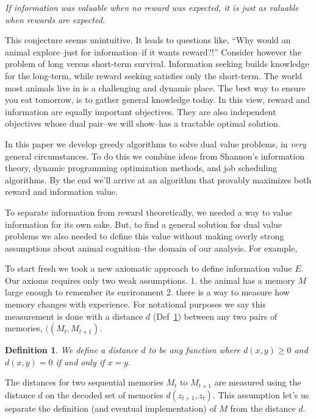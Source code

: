 \documentclass[9pt,twocolumn,twoside]{pnas-new}
\newtheorem{definition}{Definition}
\begin{document}
\textit{If information was valuable when no reward was expected, it is just as valuable when rewards are expected.}

This conjecture seems unintuitive. It leads to questions like, ``Why would an animal explore--just for information--if it wants reward?!'' Consider however the problem of long versus short-term survival. Information seeking builds knowledge for the long-term, while reward seeking satisfies only the short-term. The world most animals live in is a challenging and dynamic place. The best way to ensure you eat tomorrow, is to gather general knowledge today. In this view, reward and information are equally important objectives. They are also independent objectives whose dual pair--we will show--has a tractable optimal solution.

In this paper we develop greedy algorithms to solve dual value problems, in \textit{very} general circumstances. To do this we combine ideas from Shannon's information theory, dynamic programming optimization methods, and job scheduling algorithms. By the end we'll arrive at an algorithm that provably maximizes both reward and information value. 

To separate information from reward theoretically, we needed a way to value information for its own sake. But, to find a general solution for dual value problems we also needed to define this value without making overly strong assumptions about animal cognition--the domain of our analysis. For example, %

To start fresh we took a new axiomatic approach to define information value $E$. Our axioms requires only two weak assumptions. 1. the animal has a memory $M$ large enough to remember its environment 2. there is a way to measure how memory changes with experience. For notational purposes we say this measurement is done with a distance $d$ (Def~\ref{def:distance}) between any two pairs of memories, $((M_{t}, M_{t+1})$.

\begin{definition}
    \label{def:distance}
    We define a distance $d$ to be any function where $d(x,y) \geq 0$ and $d(x,y) = 0$ if and only if $x = y$.
\end{definition}

The distances for two sequential memories $M_{t}$ to $M_{t+1}$ are measured using the distance $d$ on the decoded set of memories $d(z_{t+1},z_{t})$. This assumption let's us separate the definition (and eventual implementation) of $M$ from the distance $d$.
\end{document}
